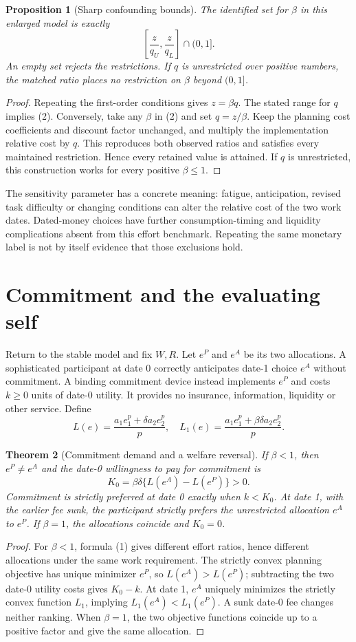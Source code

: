 \documentclass[11pt,a4paper]{article}
\newtheorem{theorem}{Theorem}[section]
\newtheorem{proposition}[theorem]{Proposition}
\theoremstyle{definition}
\theoremstyle{remark}
\begin{document}
\begin{proposition}[Sharp confounding bounds]
The identified set for $\beta$ in this enlarged model is exactly
\[
 \left[\frac z{q_U},\frac z{q_L}\right]\cap(0,1].\tag{2}
\]
An empty set rejects the restrictions. If $q$ is unrestricted over positive numbers, the matched ratio places no restriction on $\beta$ beyond $(0,1]$.
\end{proposition}
\begin{proof}
Repeating the first-order conditions gives $z=\beta q$. The stated range for $q$ implies (2). Conversely, take any $\beta$ in (2) and set $q=z/\beta$. Keep the planning cost coefficients and discount factor unchanged, and multiply the implementation relative cost by $q$. This reproduces both observed ratios and satisfies every maintained restriction. Hence every retained value is attained. If $q$ is unrestricted, this construction works for every positive $\beta\leq1$.
\end{proof}

The sensitivity parameter has a concrete meaning: fatigue, anticipation, revised task difficulty or changing conditions can alter the relative cost of the two work dates. Dated-money choices have further consumption-timing and liquidity complications absent from this effort benchmark. Repeating the same monetary label is not by itself evidence that those exclusions hold.

\section{Commitment and the evaluating self}
Return to the stable model and fix $W,R$. Let $e^P$ and $e^A$ be its two allocations. A sophisticated participant at date 0 correctly anticipates date-1 choice $e^A$ without commitment. A binding commitment device instead implements $e^P$ and costs $k\geq0$ units of date-0 utility. It provides no insurance, information, liquidity or other service. Define
\[
 L(e)=\frac{a_1e_1^p+\delta a_2e_2^p}{p},\quad
 L_1(e)=\frac{a_1e_1^p+\beta\delta a_2e_2^p}{p}.
\]

\begin{theorem}[Commitment demand and a welfare reversal]
If $\beta<1$, then $e^P\ne e^A$ and the date-0 willingness to pay for commitment is
\[
 K_0=\beta\delta\{L(e^A)-L(e^P)\}>0.
\]
Commitment is strictly preferred at date 0 exactly when $k<K_0$. At date 1, with the earlier fee sunk, the participant strictly prefers the unrestricted allocation $e^A$ to $e^P$. If $\beta=1$, the allocations coincide and $K_0=0$.
\end{theorem}
\begin{proof}
For $\beta<1$, formula (1) gives different effort ratios, hence different allocations under the same work requirement. The strictly convex planning objective has unique minimizer $e^P$, so $L(e^A)>L(e^P)$; subtracting the two date-0 utility costs gives $K_0-k$. At date 1, $e^A$ uniquely minimizes the strictly convex function $L_1$, implying $L_1(e^A)<L_1(e^P)$. A sunk date-0 fee changes neither ranking. When $\beta=1$, the two objective functions coincide up to a positive factor and give the same allocation.
\end{proof}
\end{document}
